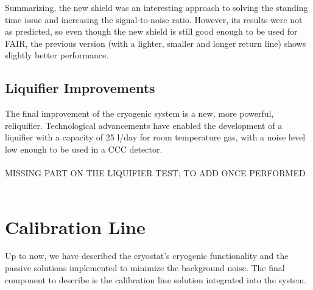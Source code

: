 \documentclass[12pt,a4paper]{report}
\begin{document}
        Summarizing, the new shield was an interesting approach to solving the standing time issue and increasing the signal-to-noise ratio. However, its results were not as predicted, so even though the new shield is still good enough to be used for FAIR, the previous version (with a lighter, smaller and longer return line) shows slightly better performance.
        
       \subsection{Liquifier Improvements}
       The final improvement of the cryogenic system is a new, more powerful, reliquifier. Technological advancements have enabled the development of a liquifier with a capacity of 25 l/day for room temperature gas, with a noise level low enough to be used in a CCC detector.
       \\
       \\
       MISSING PART ON THE LIQUIFIER TEST; TO ADD ONCE PERFORMED
       \\
       \\
       \section{Calibration Line}
       Up to now, we have described the cryostat's cryogenic functionality and the passive solutions implemented to minimize the background noise. The final component to describe is the calibration line solution integrated into the system.
       
\end{document}

